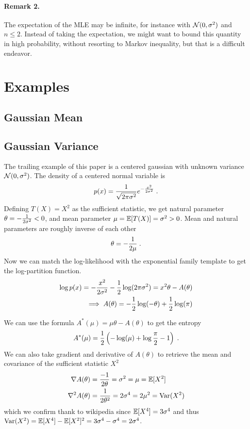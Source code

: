 \documentclass[twoside]{article}
\newcommand{\logpart}{A}
\newcommand{\conj}{\logpart^*}
\newcommand{\natp}{\theta}
\begin{document}
\paragraph{Remark 2.}
The expectation of the MLE may be infinite, for instance with ${\mathcal N}(0,\sigma^2)$ and $n\leq 2$. Instead of taking the expectation,  we might want to bound this quantity in high probability, without resorting to Markov inequality, but that is a difficult endeavor.


\section{Examples}
\subsection{Gaussian Mean}

\subsection{Gaussian Variance}
The trailing example of this paper is a centered gaussian with unknown variance ${\mathcal N}(0,\sigma^2)$.
The density of a centered normal variable is
\begin{align}
	p(x) = \frac{1}{\sqrt{2\pi \sigma^2}} e^{-\frac{x^2}{2 \sigma^2}} \; .
\end{align}
Defining $T(X)=X^2$ as the sufficient statistic, we get natural parameter $\natp = -\inv{2 \sigma^2} <0$, and mean parameter $\mu=\operatorname{\mathbb{E}}[T(X)] = \sigma^2 >0$. 
Mean and natural parameters are roughly inverse of each other
\begin{align}
	\natp = -\inv{2 \mu}\; .
\end{align}
Now we can match the log-likelihood with the exponential family template to get the log-partition function.
\begin{align}
	\log p(x) = - \frac{x^2}{2 \sigma^2} - \half \log(2 \pi \sigma^2 ) 
	= x^2 \natp - \logpart(\natp) \\
	\implies \logpart (\natp) = - \half \log(-\natp)  + \half \log(\pi) 
\end{align}

We can use the formula $\conj(\mu) = \mu \natp - \logpart(\natp)$ to get the entropy
\begin{align}
	\conj(\mu) = \half\left( -\log(\mu) + \log\frac{\pi}{2} - 1 \right) \; .
\end{align}
We can also take gradient and derivative of $\logpart(\natp)$ to retrieve the mean and covariance of the sufficient statistic $X^2$
\begin{align}
	\nabla\logpart(\natp) &= \frac{-1}{2 \natp} = \sigma^2 = \mu = \E[X^2] \\
	\nabla^2\logpart(\natp) &= \frac{1}{2 \natp^2} = 2 \sigma^4 = 2 \mu^2 = \Var(X^2) 
\end{align}
which we confirm thank to wikipedia since $\operatorname{\mathbb{E}}[X^4] = 3 \sigma^4$ and thus $\operatorname{\mathrm{Var}}(X^2) = \operatorname{\mathbb{E}}[X^4] - \operatorname{\mathbb{E}}[X^2]^2 = 3 \sigma^4 - \sigma^4 = 2 \sigma^4$.
\end{document}
